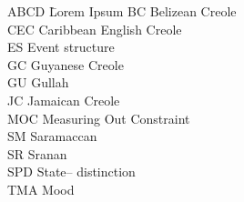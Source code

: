 \begin{tabbing}
ABCD\hspace{1cm} \= Lorem Ipsum\kill
BC \> Belizean Creole\\
CEC \> Caribbean English Creole\\
ES \> Event structure\\
GC \> Guyanese Creole\\
GU \> Gullah\\
JC \> Jamaican Creole\\
MOC \> Measuring Out Constraint\\
SM \> Saramaccan\\
SR \> Sranan\\
SPD \> State-- distinction\\
TMA \>  Mood \\
\end{tabbing}

  
